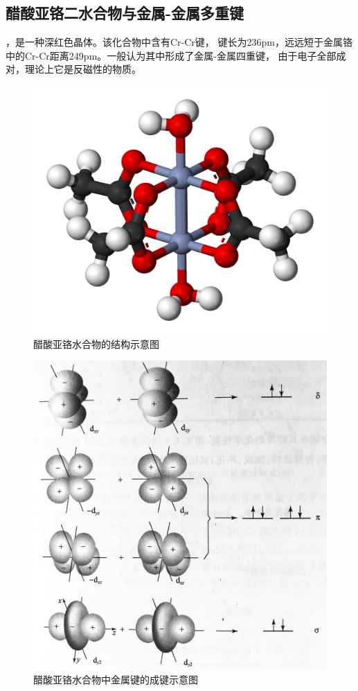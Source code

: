 \documentclass[a4paper,zihao=5,UTF8]{ctexart}
\begin{document}
        \subsection{醋酸亚铬二水合物与金属-金属多重键}
        ，是一种深红色晶体。该化合物中含有Cr-Cr键，
        键长为236pm，远远短于金属铬中的Cr-Cr距离249pm。一般认为其中形成了金属-金属四重键，
        由于电子全部成对，理论上它是反磁性的物质。
        \begin{figure}[htbp]
            \centering
            \includegraphics[scale=0.15]{Chromium(II)-acetate-dimer-3D-balls.png}
            \caption{醋酸亚铬水合物的结构示意图}
        \end{figure}
        \begin{figure}[htbp]
            \centering
            \includegraphics[scale=0.06]{delta_bond.jpg}
            \caption{醋酸亚铬水合物中金属键的成键示意图}
        \end{figure}
\end{document}
